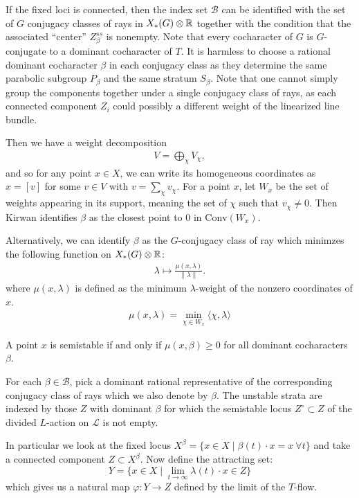 \documentclass[12pt]{article}
\begin{document}
If the fixed loci is connected, then the index set $\mathcal B$ can be identified with the set of
$G$ conjugacy classes of rays in $X_*(G) \otimes \mathbb{R}$ together with the condition that the associated “center” $Z_\beta^{ss}$ is nonempty. Note that every cocharacter of $G$ is $G$-conjugate to a dominant cocharacter of $T$. It is harmless to choose a rational dominant cocharacter $\beta$ in each conjugacy class as they determine the same parabolic subgroup $P_\beta$ and the same stratum $S_\beta$. Note that one cannot simply group the components together under a single conjugacy class of rays, as each connected component $Z_i$ could possibly a different weight of the linearized line bundle.


Then we have a weight decomposition \begin{align*}
    V = \bigoplus_{\chi} V_\chi,
\end{align*}
and so for any point $x\in X$, we can write its homogeneous coordinates as $x = [v]$ for some $v\in V$ with $v = \sum_\chi v_\chi$. For a point $x$, let $W_x$ be the set of weights appearing in its support, meaning the set of $\chi$ such that $v_\chi \neq 0$. Then Kirwan identifies $\beta$ as the closest point to $0$ in $\mathrm{Conv}(W_x)$.

Alternatively, we can identify $\beta$ as the $G$-conjugacy class of ray which minimzes the following function on $X_*(G) \otimes \mathbb{R}$:
\begin{align*}
    \lambda \mapsto \frac{\mu(x,\lambda)}{\|\lambda\|}.
\end{align*}
where $\mu(x,\lambda)$ is defined as the minimum $\lambda$-weight of the nonzero coordinates of $x$.
\begin{align*}
\mu(x,\lambda)= \min_{\chi \in W_x}\langle \chi, \lambda \rangle
\end{align*}

\begin{proposition}
     A point $x$ is semistable if and only if $\mu(x,\beta) \geq 0$ for all dominant cocharacters $\beta$.
\end{proposition}

For each $\beta\in \mathcal B$, pick a dominant rational representative of the corresponding conjugacy class of rays which we also denote by $\beta$. The unstable strata are indexed by those $Z$ with dominant $\beta$ for which
the semistable locus $Z^\circ \subset Z$ of the divided $L$-action on $\mathcal L$
is not empty. 

In particular we look at the fixed locus 
$X^\beta = \{ x \in X \mid \beta(t)\cdot x = x \ \forall t \}$ and take a connected component $Z \subset X^\beta$. Now define the attracting set:
\[Y=\{ x \in X \mid \lim_{t\to\infty} \lambda(t)\cdot x \in Z \}\] which gives us a natural map $\varphi: Y \to Z$ defined by the limit of the $T$-flow. 
\end{document}
